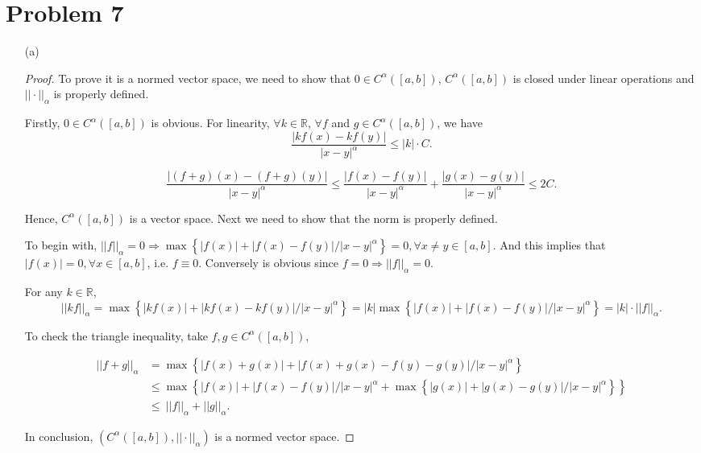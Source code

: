 \documentclass[12pt]{article}
\begin{document}
\section*{Problem 7}

\begin{enumerate}
\item [(a)]

\begin{proof}

To prove it is a normed vector space, we need to show that $0 \in C^{\alpha} ([a, b])$, $C^{\alpha} ([a, b])$ is closed under linear operations and $||\cdot||_\alpha$ is properly defined.

Firstly, $0\in C^\alpha([a, b])$ is obvious. For linearity, $\forall k\in \mathbb R$, $\forall f$ and $g\in C^\alpha([a, b])$,  we have 
$$
\frac{|kf(x) - kf(y)|}{|x-y|^\alpha} \leqslant |k|\cdot C.
$$

$$
\frac{|(f+g)(x) - (f+g)(y)|}{|x-y|^\alpha} \leqslant \frac{|f(x)-f(y)|}{|x-y|^\alpha} + \frac{|g(x)-g(y)|}{|x-y|^\alpha} \leqslant  2C.
$$

Hence, $C^{\alpha} ([a, b])$ is a vector space. Next we need to show that the norm is properly defined.

To begin with, $||f||_\alpha =0 \Rightarrow \max\left\{ |f(x)| + |f(x) - f(y)|/|x-y|^\alpha \right\} = 0, \forall x\neq y \in [a, b]$. And this implies that $|f(x)| = 0, \forall x\in[a, b]$, i.e. $f \equiv 0$. Conversely is obvious since $f = 0 \Rightarrow ||f||_\alpha = 0 $.

For any $k \in \mathbb R$, 
$$
||kf||_\alpha = \max\left\{ |kf(x)| + |kf(x) - kf(y)|/|x-y|^\alpha \right\} = |k|\max\left\{ |f(x)| + |f(x) - f(y)|/|x-y|^\alpha \right\} = |k|\cdot ||f||_\alpha.
$$ 

To check the triangle inequality, take $f, g\in C^\alpha([a, b])$, 

$$
\begin{aligned}
||f+g||_\alpha & = \max\left\{ |f(x) + g(x)| + |f(x) + g(x) - f(y) - g(y)|/|x-y|^\alpha \right\} \\
& \leqslant \max\left\{ |f(x)| + |f(x) - f(y)|/|x-y|^\alpha + \max\left\{ |g(x)| + |g(x) - g(y)|/|x-y|^\alpha \right\}  \right\} \\
& \leqslant \ ||f||_\alpha + ||g||_\alpha.
\end{aligned}
$$

In conclusion, $\left(C^{\alpha} ([a, b]), ||\cdot||_\alpha\right)$ is a normed vector space.

\end{proof}




\end{enumerate}
\end{document}

